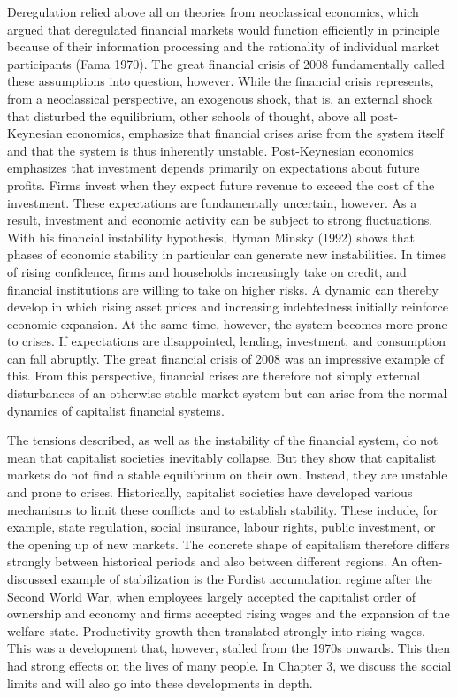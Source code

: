 \documentclass[
  british,
  a4paper,
  DIV=11,
  numbers=noendperiod,
  oneside,
  openany]{scrreprt}
\begin{document}
Deregulation relied above all on theories from neoclassical economics,
which argued that deregulated financial markets would function
efficiently in principle because of their information processing and the
rationality of individual market participants (Fama 1970). The great
financial crisis of 2008 fundamentally called these assumptions into
question, however. While the financial crisis represents, from a
neoclassical perspective, an exogenous shock, that is, an external shock
that disturbed the equilibrium, other schools of thought, above all
post-Keynesian economics, emphasize that financial crises arise from the
system itself and that the system is thus inherently unstable.
Post-Keynesian economics emphasizes that investment depends primarily on
expectations about future profits. Firms invest when they expect future
revenue to exceed the cost of the investment. These expectations are
fundamentally uncertain, however. As a result, investment and economic
activity can be subject to strong fluctuations. With his financial
instability hypothesis, Hyman Minsky (1992) shows that phases of
economic stability in particular can generate new instabilities. In
times of rising confidence, firms and households increasingly take on
credit, and financial institutions are willing to take on higher risks.
A dynamic can thereby develop in which rising asset prices and
increasing indebtedness initially reinforce economic expansion. At the
same time, however, the system becomes more prone to crises. If
expectations are disappointed, lending, investment, and consumption can
fall abruptly. The great financial crisis of 2008 was an impressive
example of this. From this perspective, financial crises are therefore
not simply external disturbances of an otherwise stable market system
but can arise from the normal dynamics of capitalist financial systems.

The tensions described, as well as the instability of the financial
system, do not mean that capitalist societies inevitably collapse. But
they show that capitalist markets do not find a stable equilibrium on
their own. Instead, they are unstable and prone to crises. Historically,
capitalist societies have developed various mechanisms to limit these
conflicts and to establish stability. These include, for example, state
regulation, social insurance, labour rights, public investment, or the
opening up of new markets. The concrete shape of capitalism therefore
differs strongly between historical periods and also between different
regions. An often-discussed example of stabilization is the Fordist
accumulation regime after the Second World War, when employees largely
accepted the capitalist order of ownership and economy and firms
accepted rising wages and the expansion of the welfare state.
Productivity growth then translated strongly into rising wages. This was
a development that, however, stalled from the 1970s onwards. This then
had strong effects on the lives of many people. In Chapter 3, we discuss
the social limits and will also go into these developments in depth.
\end{document}
